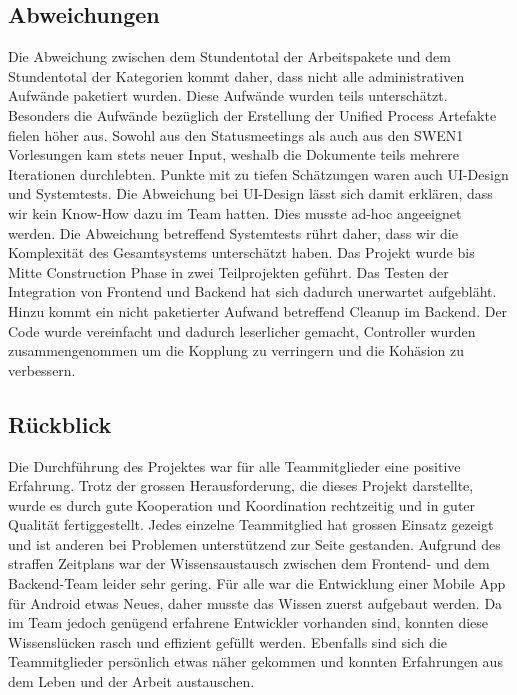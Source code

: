 \subsection{Abweichungen}\label{abweichungen}
Die Abweichung zwischen dem Stundentotal der Arbeitspakete und dem Stundentotal der Kategorien
kommt daher, dass nicht alle administrativen Aufwände paketiert wurden. Diese Aufwände wurden
teils unterschätzt.
Besonders die Aufwände bezüglich der Erstellung der Unified Process Artefakte fielen höher aus.
Sowohl aus den Statusmeetings als auch aus den SWEN1 Vorlesungen kam stets neuer Input, weshalb
die Dokumente teils mehrere Iterationen durchlebten.
Punkte mit zu tiefen Schätzungen waren auch UI-Design und Systemtests. Die Abweichung bei UI-Design
lässt sich damit erklären, dass wir kein Know-How dazu im Team hatten. Dies musste ad-hoc angeeignet
werden. Die Abweichung betreffend Systemtests rührt daher, dass wir die Komplexität des Gesamtsystems
unterschätzt haben. Das Projekt wurde bis Mitte Construction Phase in zwei Teilprojekten geführt. Das
Testen der Integration von Frontend und Backend hat sich dadurch unerwartet aufgebläht.
Hinzu kommt ein nicht paketierter Aufwand betreffend Cleanup im Backend. Der Code wurde vereinfacht und
dadurch leserlicher gemacht, Controller wurden zusammengenommen um die Kopplung zu verringern und die
Kohäsion zu verbessern.

\subsection{Rückblick}\label{rueckblick}
Die Durchführung des Projektes war für alle Teammitglieder eine positive Erfahrung. Trotz der grossen
Herausforderung, die dieses Projekt darstellte, wurde es durch gute Kooperation und Koordination
rechtzeitig und in guter Qualität fertiggestellt.
Jedes einzelne Teammitglied hat grossen Einsatz gezeigt und ist anderen bei Problemen unterstützend
zur Seite gestanden. Aufgrund des straffen Zeitplans war der Wissensaustausch zwischen dem Frontend-
und dem Backend-Team leider sehr gering.
Für alle war die Entwicklung einer Mobile App für Android etwas Neues, daher musste das Wissen zuerst
aufgebaut werden. Da im Team jedoch genügend erfahrene Entwickler vorhanden sind, konnten diese
Wissenslücken rasch und effizient gefüllt werden. Ebenfalls sind sich die Teammitglieder persönlich
etwas näher gekommen und konnten Erfahrungen aus dem Leben und der Arbeit austauschen.

\newpage
